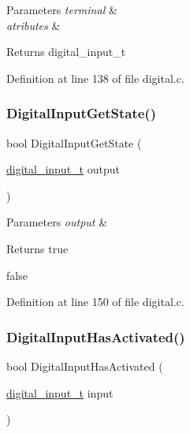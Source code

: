 \begin{DoxyParams}{Parameters}
{\em terminal} & \\
\hline
{\em atributes} & \\
\hline
\end{DoxyParams}
\begin{DoxyReturn}{Returns}
digital\+\_\+input\+\_\+t 
\end{DoxyReturn}


Definition at line 138 of file digital.\+c.

\mbox{\label{group__hal_ga2ed2289f4350106d999d17788643f909}} 
\subsubsection{\texorpdfstring{Digital\+Input\+Get\+State()}{DigitalInputGetState()}}
{\footnotesize\ttfamily bool Digital\+Input\+Get\+State (\begin{DoxyParamCaption}\item[{\hyperlink{group__hal_gaa88780f43e331bbd1d6069d75ad68fcf}{digital\+\_\+input\+\_\+t}}]{output }\end{DoxyParamCaption})}


\begin{DoxyParams}{Parameters}
{\em output} & \\
\hline
\end{DoxyParams}
\begin{DoxyReturn}{Returns}
true 

false 
\end{DoxyReturn}


Definition at line 150 of file digital.\+c.

\mbox{\label{group__hal_ga811e1a571c3e6e539b3b61bae5698047}} 
\subsubsection{\texorpdfstring{Digital\+Input\+Has\+Activated()}{DigitalInputHasActivated()}}
{\footnotesize\ttfamily bool Digital\+Input\+Has\+Activated (\begin{DoxyParamCaption}\item[{\hyperlink{group__hal_gaa88780f43e331bbd1d6069d75ad68fcf}{digital\+\_\+input\+\_\+t}}]{input }\end{DoxyParamCaption})}



